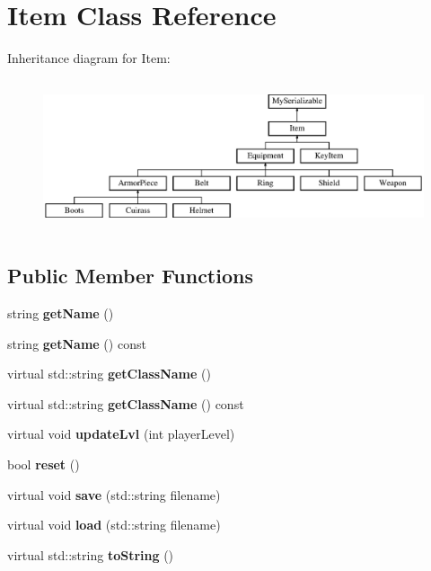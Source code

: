 \hypertarget{class_item}{}\section{Item Class Reference}
\label{class_item}
Inheritance diagram for Item\+:\begin{figure}[H]
\begin{center}
\leavevmode
\includegraphics[height=4.487180cm]{class_item}
\end{center}
\end{figure}
\subsection*{Public Member Functions}
\begin{DoxyCompactItemize}
\item 
\hypertarget{class_item_a63d7f2148b699e539aae354b01559811}{}\label{class_item_a63d7f2148b699e539aae354b01559811} 
string {\bfseries get\+Name} ()
\item 
\hypertarget{class_item_a8d2b9d404f8e692f456af88a1eb1ce44}{}\label{class_item_a8d2b9d404f8e692f456af88a1eb1ce44} 
string {\bfseries get\+Name} () const
\item 
\hypertarget{class_item_a49bc6fcbaf2e8e6695ad22408adedf5e}{}\label{class_item_a49bc6fcbaf2e8e6695ad22408adedf5e} 
virtual std\+::string {\bfseries get\+Class\+Name} ()
\item 
\hypertarget{class_item_a1350dcc7942c35ddc6dc4bf646e8c663}{}\label{class_item_a1350dcc7942c35ddc6dc4bf646e8c663} 
virtual std\+::string {\bfseries get\+Class\+Name} () const
\item 
\hypertarget{class_item_ae1461c50b7b64395132317e24027dc08}{}\label{class_item_ae1461c50b7b64395132317e24027dc08} 
virtual void {\bfseries update\+Lvl} (int player\+Level)
\item 
\hypertarget{class_item_a96cce91c32165e1ed182138930ccb751}{}\label{class_item_a96cce91c32165e1ed182138930ccb751} 
bool {\bfseries reset} ()
\item 
\hypertarget{class_item_a3e358c86a1c658109eb797476051a1d6}{}\label{class_item_a3e358c86a1c658109eb797476051a1d6} 
virtual void {\bfseries save} (std\+::string filename)
\item 
\hypertarget{class_item_a9b426ccb054272b8059ba53923a61bd7}{}\label{class_item_a9b426ccb054272b8059ba53923a61bd7} 
virtual void {\bfseries load} (std\+::string filename)
\item 
\hypertarget{class_item_ac6e6f565235b7f7a6150a8dcf57ed66a}{}\label{class_item_ac6e6f565235b7f7a6150a8dcf57ed66a} 
virtual std\+::string {\bfseries to\+String} ()
\end{DoxyCompactItemize}
